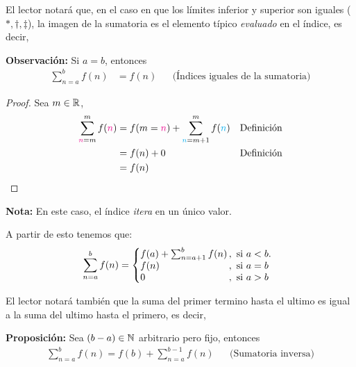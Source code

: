   El lector notará que, en el caso en que los límites inferior y superior son iguales ($*, \dag, \ddag$), la imagen de la sumatoria es el elemento típico \textit{evaluado} en el índice, es decir,

  \textbf{Observación:} Si $a=b$, entonces
  \begin{align*}
    \sum_{n=a}^{b} f(n) &= f(n) && \text{(Índices iguales de la sumatoria)}
  \end{align*}

  \begin{proof}\leavevmode
    Sea $m\in \mathbb{R}$,
  \begin{align*}
    \sum_{{\color{magenta}n}=m}^{m} f({\color{magenta}n}) &= f(m={\color{magenta}n}) + \sum_{{\color{cyan}n}=m+1}^{m} f({\color{cyan}n}) && \text{Definición}\\
    &= f(n) + 0 && \text{Definición}\\
    &= f(n) && \qedhere
  \end{align*}
  \end{proof}

  \textbf{Nota:} En este caso, el índice \textit{itera} en un único valor.

  A partir de esto tenemos que:
  \[
    \sum_{n=a}^{b} f(n) = \left\{
    \begin{array}{@{}l@{\thinspace}l}
    f(a) + \sum_{n=a+1}^{b} f(n) &,  \ \text{si}  \ a<b.\\
    f(n) &,  \ \text{si}  \ a=b\\
    0 &,  \ \text{si}  \ a>b
    \end{array} \right. \]

    El lector notará también que la suma del primer termino hasta el ultimo es
    igual a la suma del ultimo hasta el primero, es decir,

    \textbf{Proposición:} Sea $(b-a)\in \mathbb{N}$ arbitrario pero fijo, entonces
    \begin{align*}
      \sum_{n=a}^{b} f(n) = f(b) + \sum_{n=a}^{b-1} f(n) && \text{(Sumatoria inversa)}
    \end{align*}

